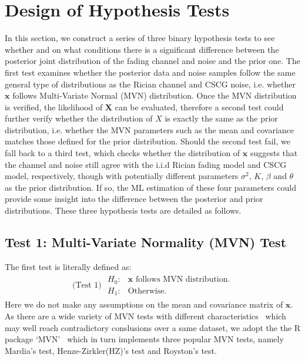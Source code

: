 \documentclass[journal,draftcls,onecolumn,12pt,twoside]{IEEEtran}
\begin{document}
\section{Design of Hypothesis Tests}
\label{sec:tests}
In this section, we construct a series of three binary hypothesis tests to see
whether and on what conditions there is a significant difference between the posterior
joint distribution of the fading channel and noise and the prior one. The first
test examines whether the posterior data and noise samples follow the same
general type of distributions as the Rician channel and CSCG noise, i.e. whether
$\mathbf{x}$ follows Multi-Variate Normal (MVN) distribution. Once the MVN
distribution is verified, the likelihood of $\mathbf{X}$ can be evaluated,
therefore a second test could further verify whether the distribution of $X$ is
exactly the same as the prior distribution, i.e. whether the MVN parameters
such as the mean and covariance matches those defined for the prior
distribution. Should the second test fail, we fall back to a third test, which
checks whether the distribution of $\mathbf{x}$ suggests that the channel
and noise still agree with the i.i.d Rician fading model and CSCG model,
respectively, though with potentially different parameters $\sigma^2$, $K$,
$\beta$ and $\theta$ as the prior distribution. If so, the ML estimation of
these four parameters could provide some insight into the difference between the
posterior and prior distributions. These three hypothesis tests are detailed as
follows.

\subsection{Test 1: Multi-Variate Normality (MVN) Test}
The first test is literally defined as:
\begin{align}
  \mbox{(Test 1) } \begin{array}{ll}H_0: & \mathbf{x}\mbox{ follows MVN
  distribution.} \\ H_1: & \mbox{Otherwise.} \end{array}
\end{align}
Here we do not make any assumptions on the mean and covariance matrix of
$\mathbf{x}$. As there are a wide variety of MVN tests with different
characteristics~\cite{mecklin2005monte} which may well reach contradictory
conslusions over a same dataset, we adopt the the R package
`MVN'~\cite{korkmaz2014mvn} which in turn implements three popular MVN tests,
namely Mardia's test, Henze-Zirkler(HZ)'s test and Royston's test.
\end{document}
